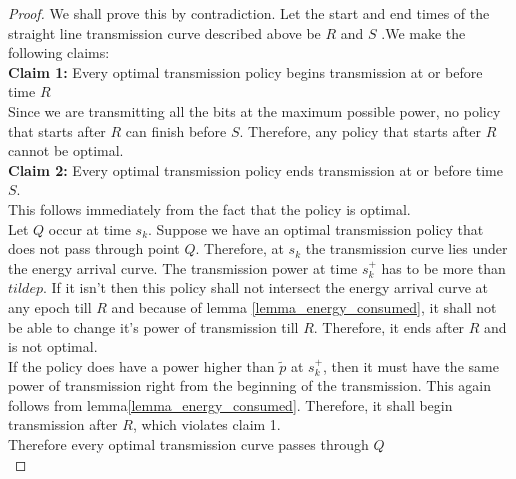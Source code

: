 \begin{proof}
We shall prove this by contradiction. Let the start and end times of the straight line transmission curve described above be $R$ and $S$ .We make the following claims:\\
\textbf{Claim 1:} Every optimal transmission policy begins transmission at or before time $R$\\
Since we are transmitting all the bits at the maximum possible power, no policy that starts after $R$ can finish before $S$. Therefore, any policy that starts after $R$ cannot be optimal.\\
\textbf{Claim 2:} Every optimal transmission policy ends transmission at or before time $S$.\\
This follows immediately from the fact that the policy is optimal. \\
Let $Q$ occur at time $s_k$. Suppose we have an optimal transmission policy that does not pass through point $Q$. Therefore, at $s_k$ the transmission curve lies under the energy arrival curve. The transmission power at time $s_k^+$ has to be more than $tilde{p}$. If it isn't then this policy shall not intersect the energy arrival curve at any epoch till $R$ and because of lemma \ref{lemma_energy_consumed}, it shall not be able to change it's power of transmission till $R$. Therefore, it ends after $R$ and is not optimal.\\
If the policy does have a power higher than $\tilde{p}$ at $s_k^+$, then it must have the same power of transmission right from the beginning of the transmission. This again follows from lemma\ref{lemma_energy_consumed}. Therefore, it shall begin transmission after $R$, which violates claim 1. \\
Therefore every optimal transmission curve passes through $Q$\\
\end{proof}


